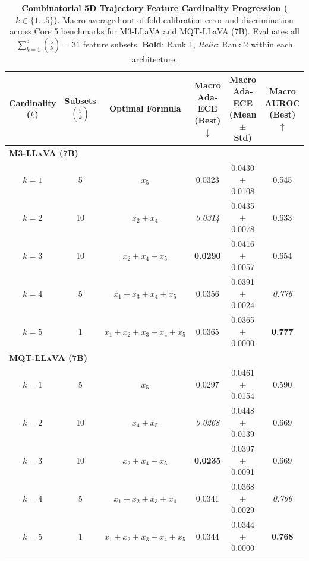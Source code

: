\begin{table}[t]
\setlength{\tabcolsep}{4pt}
\renewcommand{\arraystretch}{1.05}
\centering
\small
\begin{tabular}{cccccc}
\toprule
\textbf{Cardinality ($k$)} & \textbf{Subsets $\binom{5}{k}$} & \textbf{Optimal Formula} & \textbf{Macro Ada-ECE (Best) $\downarrow$} & \textbf{Macro Ada-ECE (Mean $\pm$ Std)} & \textbf{Macro AUROC (Best) $\uparrow$} \\
\midrule
\multicolumn{6}{l}{\textsc{\textbf{M3-LLaVA (7B)}}} \\
\midrule
$k = 1$ & 5 & $x_{5}$ & 0.0323 & 0.0430 $\pm$ 0.0108 & 0.545 \\
$k = 2$ & 10 & $x_{2} + x_{4}$ & \textit{0.0314} & 0.0435 $\pm$ 0.0078 & 0.633 \\
$k = 3$ & 10 & $x_{2} + x_{4} + x_{5}$ & \textbf{0.0290} & 0.0416 $\pm$ 0.0057 & 0.654 \\
$k = 4$ & 5 & $x_{1} + x_{3} + x_{4} + x_{5}$ & 0.0356 & 0.0391 $\pm$ 0.0024 & \textit{0.776} \\
$k = 5$ & 1 & $x_{1} + x_{2} + x_{3} + x_{4} + x_{5}$ & 0.0365 & 0.0365 $\pm$ 0.0000 & \textbf{0.777} \\
\midrule
\multicolumn{6}{l}{\textsc{\textbf{MQT-LLaVA (7B)}}} \\
\midrule
$k = 1$ & 5 & $x_{5}$ & 0.0297 & 0.0461 $\pm$ 0.0154 & 0.590 \\
$k = 2$ & 10 & $x_{4} + x_{5}$ & \textit{0.0268} & 0.0448 $\pm$ 0.0139 & 0.669 \\
$k = 3$ & 10 & $x_{2} + x_{4} + x_{5}$ & \textbf{0.0235} & 0.0397 $\pm$ 0.0091 & 0.669 \\
$k = 4$ & 5 & $x_{1} + x_{2} + x_{3} + x_{4}$ & 0.0341 & 0.0368 $\pm$ 0.0029 & \textit{0.766} \\
$k = 5$ & 1 & $x_{1} + x_{2} + x_{3} + x_{4} + x_{5}$ & 0.0344 & 0.0344 $\pm$ 0.0000 & \textbf{0.768} \\
\bottomrule
\end{tabular}
\caption{\textbf{Combinatorial 5D Trajectory Feature Cardinality Progression ($k \in \{1 \dots 5\}$)}. Macro-averaged out-of-fold calibration error and discrimination across Core 5 benchmarks for M3-LLaVA and MQT-LLaVA (7B). Evaluates all $\sum_{k=1}^5 \binom{5}{k} = 31$ feature subsets. \textbf{Bold}: Rank 1, \textit{Italic}: Rank 2 within each architecture.}
\label{tab:ablation_5d_macro_progression}
\end{table}

